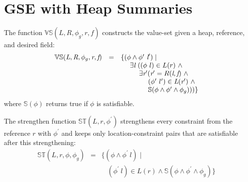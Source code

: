 \section{GSE with Heap Summaries}

The function $\mathbb{VS}(L,R,\phi_g,r,f)$ constructs the value-set given a
heap, reference, and desired field:
\[
\begin{array}{rcl}
  \mathbb{VS}(\cfgnt{L},\cfgnt{R},\phi_g,\cfgnt{r},\cfgnt{f}) & = & \{(\phi\wedge\phi^\prime\ \cfgnt{l}^\prime) \mid \\
  & & \ \ \ \ \exists \cfgnt{l}\ ((\phi\ l) \in L(r)\ \wedge \\
  & & \ \ \ \ \ \ \ \ \exists \cfgnt{r}^\prime ( \cfgnt{r}^\prime = R(\cfgnt{l},\cfgnt{f})\ \wedge \\
  & & \ \ \ \ \ \ \ \ \ \ \ \ (\phi^\prime\ l^\prime) \in \cfgnt{L}(\cfgnt{r}^\prime)\ \wedge\\
  & & \ \ \ \ \ \ \ \ \ \ \ \ \mathbb{S}(\phi\wedge\phi^\prime\wedge \phi_g)))\}
\end{array}
\]
where $\mathbb{S}(\phi)$ returns true if $\phi$ is satisfiable.

The strengthen function $\mathbb{ST}(L,r,\phi^\prime)$ strengthens every
constraint from the reference $r$ with $\phi^\prime$ and keeps only location-constraint
pairs that are satisfiable after this strengthening:
\[
\begin{array}{rcl} 
\mathbb{ST}(L,r,\phi,\phi_g) & = & \{ (\phi\wedge\phi^\prime\ l) \mid  \\
& & \ \ \ \ (\phi^\prime\ l)\in L(r)\wedge\mathbb{S}(\phi\wedge\phi^\prime\wedge\phi_g) \}
\end{array}
\]



